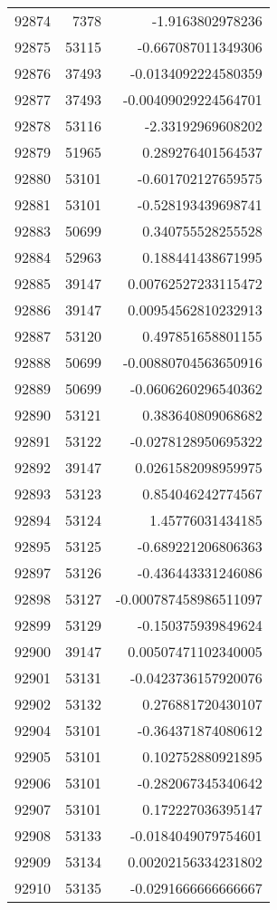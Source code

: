 \begin{tabular}{r | r | r}
92874 & 7378 & -1.9163802978236 \\
92875 & 53115 & -0.667087011349306 \\
92876 & 37493 & -0.0134092224580359 \\
92877 & 37493 & -0.00409029224564701 \\
92878 & 53116 & -2.33192969608202 \\
92879 & 51965 & 0.289276401564537 \\
92880 & 53101 & -0.601702127659575 \\
92881 & 53101 & -0.528193439698741 \\
92883 & 50699 & 0.340755528255528 \\
92884 & 52963 & 0.188441438671995 \\
92885 & 39147 & 0.00762527233115472 \\
92886 & 39147 & 0.00954562810232913 \\
92887 & 53120 & 0.497851658801155 \\
92888 & 50699 & -0.00880704563650916 \\
92889 & 50699 & -0.0606260296540362 \\
92890 & 53121 & 0.383640809068682 \\
92891 & 53122 & -0.0278128950695322 \\
92892 & 39147 & 0.0261582098959975 \\
92893 & 53123 & 0.854046242774567 \\
92894 & 53124 & 1.45776031434185 \\
92895 & 53125 & -0.689221206806363 \\
92897 & 53126 & -0.436443331246086 \\
92898 & 53127 & -0.000787458986511097 \\
92899 & 53129 & -0.150375939849624 \\
92900 & 39147 & 0.00507471102340005 \\
92901 & 53131 & -0.0423736157920076 \\
92902 & 53132 & 0.276881720430107 \\
92904 & 53101 & -0.364371874080612 \\
92905 & 53101 & 0.102752880921895 \\
92906 & 53101 & -0.282067345340642 \\
92907 & 53101 & 0.172227036395147 \\
92908 & 53133 & -0.0184049079754601 \\
92909 & 53134 & 0.00202156334231802 \\
92910 & 53135 & -0.0291666666666667 \\

\end{tabular}
